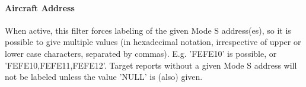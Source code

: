 \paragraph{Aircraft Address}

When active, this filter forces labeling of the given Mode S address(es), so it is possible to give multiple values (in hexadecimal notation, irrespective of upper or lower case characters, separated by commas). E.g. 'FEFE10' is possible, or 'FEFE10,FEFE11,FEFE12'. Target reports without a given Mode S address will not be labeled unless the value 'NULL' is (also) given.



